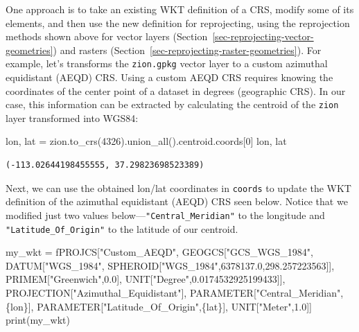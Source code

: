 \documentclass[
  letterpaper,
]{krantz}
\newenvironment{Shaded}{\begin{snugshade}}{\end{snugshade}}
\newcommand{\BuiltInTok}[1]{\textcolor[rgb]{0.00,0.23,0.31}{#1}}
\newcommand{\DecValTok}[1]{\textcolor[rgb]{0.68,0.00,0.00}{#1}}
\newcommand{\NormalTok}[1]{\textcolor[rgb]{0.00,0.23,0.31}{#1}}
\newcommand{\OperatorTok}[1]{\textcolor[rgb]{0.37,0.37,0.37}{#1}}
\newcommand{\SpecialCharTok}[1]{\textcolor[rgb]{0.37,0.37,0.37}{#1}}
\newcommand{\SpecialStringTok}[1]{\textcolor[rgb]{0.13,0.47,0.30}{#1}}
\begin{document}
One approach is to take an existing WKT definition of a CRS, modify some
of its elements, and then use the new definition for reprojecting, using
the reprojection methods shown above for vector layers
(Section~\ref{sec-reprojecting-vector-geometries}) and rasters
(Section~\ref{sec-reprojecting-raster-geometries}). For example, let's
transforms the \texttt{zion.gpkg} vector layer to a custom azimuthal
equidistant (AEQD) CRS. Using a custom AEQD CRS requires knowing the
coordinates of the center point of a dataset in degrees (geographic
CRS). In our case, this information can be extracted by calculating the
centroid of the \texttt{zion} layer transformed into WGS84:

\begin{Shaded}
\begin{Highlighting}[]
\NormalTok{lon, lat }\OperatorTok{=}\NormalTok{ zion.to\_crs(}\DecValTok{4326}\NormalTok{).union\_all().centroid.coords[}\DecValTok{0}\NormalTok{]}
\NormalTok{lon, lat}
\end{Highlighting}
\end{Shaded}

\begin{verbatim}
(-113.02644198455555, 37.29823698523389)
\end{verbatim}

Next, we can use the obtained lon/lat coordinates in \texttt{coords} to
update the WKT definition of the azimuthal equidistant (AEQD) CRS seen
below. Notice that we modified just two values
below---\texttt{"Central\_Meridian"} to the longitude and
\texttt{"Latitude\_Of\_Origin"} to the latitude of our centroid.

\begin{Shaded}
\begin{Highlighting}[]
\NormalTok{my\_wkt }\OperatorTok{=} \SpecialStringTok{f\textquotesingle{}\textquotesingle{}\textquotesingle{}PROJCS["Custom\_AEQD",}
\SpecialStringTok{ GEOGCS["GCS\_WGS\_1984",}
\SpecialStringTok{  DATUM["WGS\_1984",}
\SpecialStringTok{   SPHEROID["WGS\_1984",6378137.0,298.257223563]],}
\SpecialStringTok{  PRIMEM["Greenwich",0.0],}
\SpecialStringTok{  UNIT["Degree",0.0174532925199433]],}
\SpecialStringTok{ PROJECTION["Azimuthal\_Equidistant"],}
\SpecialStringTok{ PARAMETER["Central\_Meridian",}\SpecialCharTok{\{}\NormalTok{lon}\SpecialCharTok{\}}\SpecialStringTok{],}
\SpecialStringTok{ PARAMETER["Latitude\_Of\_Origin",}\SpecialCharTok{\{}\NormalTok{lat}\SpecialCharTok{\}}\SpecialStringTok{],}
\SpecialStringTok{ UNIT["Meter",1.0]]\textquotesingle{}\textquotesingle{}\textquotesingle{}}
\BuiltInTok{print}\NormalTok{(my\_wkt)}
\end{Highlighting}
\end{Shaded}
\end{document}
